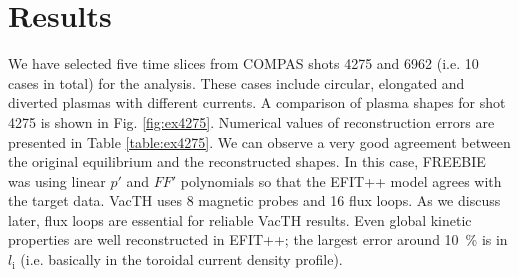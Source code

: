 
\section{Results} %
\label{sec:results}

We have selected five time slices from COMPAS shots 4275 and 6962 (i.e. 10 cases in total) for the analysis. These cases include circular, elongated and diverted plasmas with different currents. A comparison of plasma shapes for shot 4275 is shown in Fig. \ref{fig:ex4275}. Numerical values of reconstruction errors are presented in Table \ref{table:ex4275}. We can observe a very good agreement between the original equilibrium and the reconstructed shapes. In this case, FREEBIE was using linear $p'$ and $FF'$ polynomials so that the EFIT++ model agrees with the target data. VacTH uses 8 magnetic probes and 16 flux loops. As we discuss later, flux loops are essential for reliable VacTH results. Even global kinetic properties are well reconstructed in EFIT++; the largest error around 10~\% is in $l_{\mathrm i}$ (i.e. basically in the toroidal current density profile).

